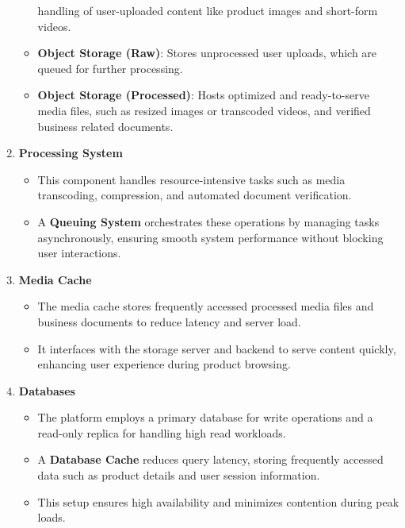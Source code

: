\documentclass[12pt]{report}
\begin{document}
\begin{enumerate}
\begin{itemize}
		            handling of user-uploaded content like product images and short-form videos.
		      \item \textbf{Object Storage (Raw)}: Stores unprocessed user uploads, which are queued
		            for further processing.
		      \item \textbf{Object Storage (Processed)}: Hosts optimized and ready-to-serve media files,
		            such as resized images or transcoded videos, and verified business related
		            documents.
	      \end{itemize}
	\item \textbf{Processing System}
	      \begin{itemize}
		      \item This component handles resource-intensive tasks such as media transcoding,
		            compression, and automated document verification.
		      \item A \textbf{Queuing System} orchestrates these operations by managing tasks
		            asynchronously, ensuring smooth system performance without blocking user
		            interactions.
	      \end{itemize}
	\item \textbf{Media Cache}
	      \begin{itemize}
		      \item The media cache stores frequently accessed processed media files and
		            business documents to reduce latency and server load.
		      \item It interfaces with the storage server and backend to serve content quickly,
		            enhancing user experience during product browsing.
	      \end{itemize}
	\item \textbf{Databases}
	      \begin{itemize}
		      \item The platform employs a primary database for write operations and a read-only
		            replica for handling high read workloads.
		      \item A \textbf{Database Cache} reduces query latency, storing frequently accessed data
		            such as product details and user session information.
		      \item This setup ensures high availability and minimizes contention during peak
		            loads.
	      \end{itemize}
\end{enumerate}
\end{document}
